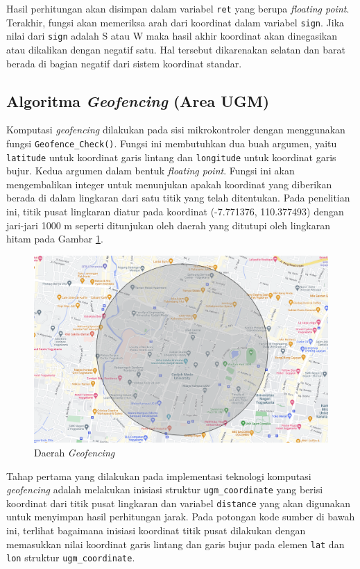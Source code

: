 Hasil perhitungan akan disimpan dalam variabel \texttt{ret} yang berupa \textit{floating point}. Terakhir, fungsi akan memeriksa arah dari koordinat dalam variabel \texttt{sign}. Jika nilai dari \texttt{sign} adalah S atau W maka hasil akhir koordinat akan dinegasikan atau dikalikan dengan negatif satu. Hal tersebut dikarenakan selatan dan barat berada di bagian negatif dari sistem koordinat standar.

\subsection{Algoritma \textit{Geofencing} (Area UGM)}
Komputasi \textit{geofencing} dilakukan pada sisi mikrokontroler dengan menggunakan fungsi \texttt{Geofence\_Check()}. Fungsi ini membutuhkan dua buah argumen, yaitu \texttt{latitude} untuk koordinat garis lintang dan \texttt{longitude} untuk koordinat garis bujur. Kedua argumen dalam bentuk \textit{floating point}. Fungsi ini akan mengembalikan integer untuk menunjukan apakah koordinat yang diberikan berada di dalam lingkaran dari satu titik yang telah ditentukan. Pada penelitian ini, titik pusat lingkaran diatur pada koordinat (-7.771376, 110.377493) dengan jari-jari 1000 m seperti ditunjukan oleh daerah yang ditutupi oleh lingkaran hitam pada Gambar \ref{Fig: geofence-map}.

\begin{figure}[H]
	\centering
	\includegraphics[width=12cm]{contents/chapter-3/geofence-map.png}
	\caption{Daerah \textit{Geofencing}}
	\label{Fig: geofence-map}
\end{figure}

Tahap pertama yang dilakukan pada implementasi teknologi komputasi \textit{geofencing} adalah melakukan inisiasi struktur \texttt{ugm\_coordinate} yang berisi koordinat dari titik pusat lingkaran dan variabel \texttt{distance} yang akan digunakan untuk menyimpan hasil perhitungan jarak. Pada potongan kode sumber di bawah ini, terlihat bagaimana inisiasi koordinat titik pusat dilakukan dengan memasukkan nilai koordinat garis lintang dan garis bujur pada elemen \texttt{lat} dan \texttt{lon} struktur \texttt{ugm\_coordinate}.

